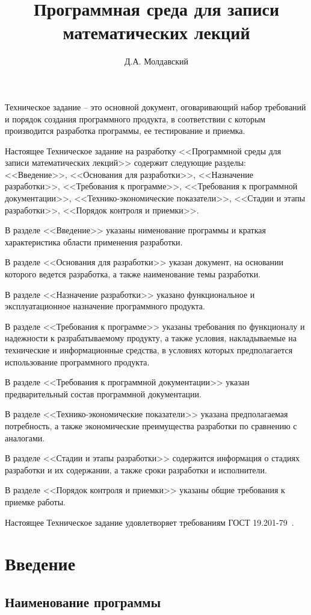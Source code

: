 \documentclass[techtask]{espd}
\author{Д.А. Молдавский}
\title{Программная среда для записи\\математических лекций}
\begin{document}
\annotation
Техническое задание -- это основной документ, оговаривающий набор требований и порядок создания программного продукта, в соответствии с которым производится разработка программы, ее тестирование и приемка.

Настоящее Техническое задание на разработку <<Программной среды для записи математических лекций>> содержит следующие разделы: <<Введение>>, <<Основания для разработки>>, <<Назначение разработки>>, <<Требования к программе>>, <<Требования к программной документации>>, <<Технико-экономические показатели>>, <<Стадии и этапы разработки>>, <<Порядок контроля и приемки>>.

В разделе <<Введение>> указаны нименование программы и краткая характеристика области применения разработки.

В разделе <<Основания для разработки>> указан документ, на основании которого ведется разработка, а также наименование темы разработки.

В разделе <<Назначение разработки>> указано функциональное и эксплуатационное назначение программного продукта.

В разделе <<Требования к программе>> указаны требования по функционалу и надежности к разрабатываемому продукту, а также условия, накладываемые на технические и информационные средства, в условиях которых предполагается использование программного продукта.

В разделе <<Требования к программной документации>> указан предварительный состав программной документации.

В разделе <<Технико-экономические показатели>> указана предполагаемая потребность, а также экономические преимущества разработки по сравнению с аналогами.

В разделе <<Стадии и этапы разработки>> содержится информация о стадиях разработки и их содержании, а также сроки разработки и исполнители.

В разделе <<Порядок контроля и приемки>> указаны общие требования к приемке работы.

Настоящее Техническое задание удовлетворяет требованиям ГОСТ 19.201-79~\cite{espd201}.

\tableofcontents

\section{Введение}
\subsection{Наименование программы}
\end{document}
